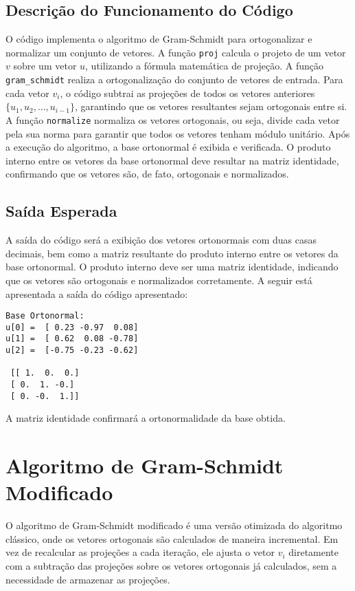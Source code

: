 \subsection{Descrição do Funcionamento do Código}

O código implementa o algoritmo de Gram-Schmidt para ortogonalizar e normalizar um conjunto de vetores. A função \texttt{proj} calcula o projeto de um vetor \(v\) sobre um vetor \(u\), utilizando a fórmula matemática de projeção. A função \texttt{gram\_schmidt} realiza a ortogonalização do conjunto de vetores de entrada. Para cada vetor \(v_i\), o código subtrai as projeções de todos os vetores anteriores \(\{u_1, u_2, \dots, u_{i-1}\}\), garantindo que os vetores resultantes sejam ortogonais entre si. A função \texttt{normalize} normaliza os vetores ortogonais, ou seja, divide cada vetor pela sua norma para garantir que todos os vetores tenham módulo unitário. Após a execução do algoritmo, a base ortonormal é exibida e verificada. O produto interno entre os vetores da base ortonormal deve resultar na matriz identidade, confirmando que os vetores são, de fato, ortogonais e normalizados.

\subsection{Saída Esperada}

A saída do código será a exibição dos vetores ortonormais com duas casas decimais, bem como a matriz resultante do produto interno entre os vetores da base ortonormal. O produto interno deve ser uma matriz identidade, indicando que os vetores são ortogonais e normalizados corretamente. A seguir está apresentada a saída do código apresentado:

\begin{lstlisting}
Base Ortonormal:
u[0] =  [ 0.23 -0.97  0.08]
u[1] =  [ 0.62  0.08 -0.78]
u[2] =  [-0.75 -0.23 -0.62]

 [[ 1.  0.  0.]
 [ 0.  1. -0.]
 [ 0. -0.  1.]]
\end{lstlisting}
A matriz identidade confirmará a ortonormalidade da base obtida.

\section{Algoritmo de Gram-Schmidt Modificado}

O algoritmo de Gram-Schmidt modificado é uma versão otimizada do algoritmo clássico, onde os vetores ortogonais são calculados de maneira incremental. Em vez de recalcular as projeções a cada iteração, ele ajusta o vetor \( v_i \) diretamente com a subtração das projeções sobre os vetores ortogonais já calculados, sem a necessidade de armazenar as projeções.

